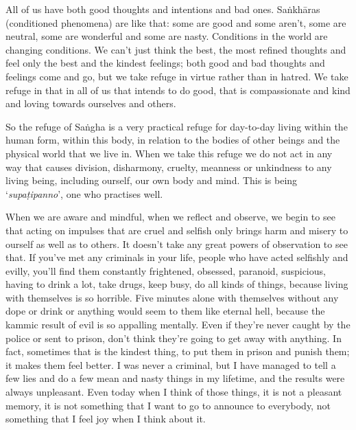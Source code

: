 All of us have both good thoughts and intentions and bad ones. Sa\.nkh\=aras (conditioned phenomena) are like that: some are good and some aren't, some are neutral, some are wonderful and some are nasty. Conditions in the world are changing conditions. We can't just think the best, the most refined thoughts and feel only the best and the kindest feelings; both good and bad thoughts and feelings come and go, but we take refuge in virtue rather than in hatred. We take refuge in that in all of us that intends to do good, that is compassionate and kind and loving towards ourselves and others.

So the refuge of Sa\.ngha is a very practical refuge for day-to-day living within the human form, within this body, in relation to the bodies of other beings and the physical world that we live in. When we take this refuge we do not act in any way that causes division, disharmony, cruelty, meanness or unkindness to any living being, including ourself, our own body and mind. This is being `\textit{supa\d{t}ipanno}', one who practises well.

When we are aware and mindful, when we reflect and observe, we begin to see that acting on impulses that are cruel and selfish only brings harm and misery to ourself as well as to others. It doesn't take any great powers of observation to see that. If you've met any criminals in your life, people who have acted selfishly and evilly, you'll find them constantly frightened, obsessed, paranoid, suspicious, having to drink a lot, take drugs, keep busy, do all kinds of things, because living with themselves is so horrible. Five minutes alone with themselves without any dope or drink or anything would seem to them like eternal hell, because the kammic result of evil is so appalling mentally. Even if they're never caught by the police or sent to prison, don't think they're going to get away with anything. In fact, sometimes that is the kindest thing, to put them in prison and punish them; it makes them feel better. I was never a criminal, but I have managed to tell a few lies and do a few mean and nasty things in my lifetime, and the results were always unpleasant. Even today when I think of those things, it is not a pleasant memory, it is not something that I want to go to announce to everybody, not something that I feel joy when I think about it.

